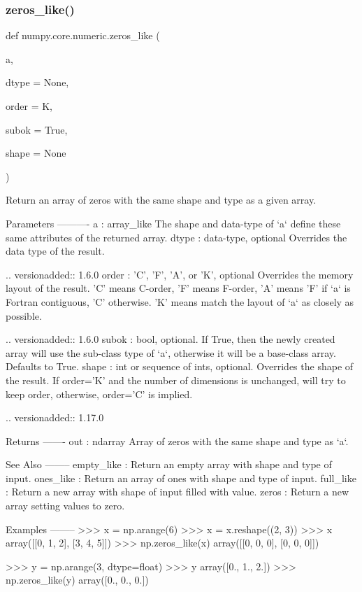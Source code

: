 \subsubsection{\texorpdfstring{zeros\+\_\+like()}{zeros\_like()}}
{\footnotesize\ttfamily def numpy.\+core.\+numeric.\+zeros\+\_\+like (\begin{DoxyParamCaption}\item[{}]{a,  }\item[{}]{dtype = {\ttfamily None},  }\item[{}]{order = {\ttfamily \textquotesingle{}K\textquotesingle{}},  }\item[{}]{subok = {\ttfamily True},  }\item[{}]{shape = {\ttfamily None} }\end{DoxyParamCaption})}

\begin{DoxyVerb}Return an array of zeros with the same shape and type as a given array.

Parameters
----------
a : array_like
    The shape and data-type of `a` define these same attributes of
    the returned array.
dtype : data-type, optional
    Overrides the data type of the result.

    .. versionadded:: 1.6.0
order : {'C', 'F', 'A', or 'K'}, optional
    Overrides the memory layout of the result. 'C' means C-order,
    'F' means F-order, 'A' means 'F' if `a` is Fortran contiguous,
    'C' otherwise. 'K' means match the layout of `a` as closely
    as possible.

    .. versionadded:: 1.6.0
subok : bool, optional.
    If True, then the newly created array will use the sub-class
    type of `a`, otherwise it will be a base-class array. Defaults
    to True.
shape : int or sequence of ints, optional.
    Overrides the shape of the result. If order='K' and the number of
    dimensions is unchanged, will try to keep order, otherwise,
    order='C' is implied.

    .. versionadded:: 1.17.0

Returns
-------
out : ndarray
    Array of zeros with the same shape and type as `a`.

See Also
--------
empty_like : Return an empty array with shape and type of input.
ones_like : Return an array of ones with shape and type of input.
full_like : Return a new array with shape of input filled with value.
zeros : Return a new array setting values to zero.

Examples
--------
>>> x = np.arange(6)
>>> x = x.reshape((2, 3))
>>> x
array([[0, 1, 2],
       [3, 4, 5]])
>>> np.zeros_like(x)
array([[0, 0, 0],
       [0, 0, 0]])

>>> y = np.arange(3, dtype=float)
>>> y
array([0., 1., 2.])
>>> np.zeros_like(y)
array([0.,  0.,  0.])\end{DoxyVerb}
 


